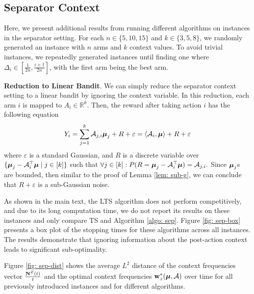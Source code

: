 \subsection{Separator Context}
    Here, we present additional results from running different algorithms on instances in the separator setting. For each $n \in \{5, 10, 15\}$ and $k \in \{3, 5, 8\}$, we randomly generated an instance with $n$ arms and $k$ context values. To avoid trivial instances, we repeatedly generated instances until finding one where $\Delta_i \in \left[\frac{1}{2n}, \frac{i+1}{2n}\right]$, with the first arm being the best arm. 


    \textbf{Reduction to Linear Bandit}. We can simply reduce the separator context setting to a linear bandit by ignoring the context variable. In this reduction, each arm $i$ is mapped to $A_{i} \in \mathbb{R}^{k}$. Then, the reward after taking action $i$ has the following equation
    $$
        Y_i = \sum_{j = 1}^{k} \mathcal{A}_{j, i} \boldsymbol{\mu}_{j} + R + \varepsilon = \langle \mathcal{A}_{i}, \boldsymbol{\mu} \rangle  + R + \varepsilon
    $$
    where $\varepsilon$ is a standard Gaussian, and $R$ is a discrete variable over $\{\boldsymbol{\mu}_j - \mathcal{A}_{i}^{\top} \boldsymbol{\mu} \mid j \in [k] \}$ such that
    $
        \forall j \in [k]: P (R  = \boldsymbol{\mu}_j - \mathcal{A}_{i}^{\top} \boldsymbol{\mu}) = \mathcal{A}_{j, i}.
    $
    Since $\boldsymbol{\mu}_j$s are bounded, then similar to the proof of Lemma \ref{lem: sub-g}, we can conclude that $R + \varepsilon$ is a sub-Gaussian noise.

    As shown in the main text, the LTS algorithm does not perform competitively, and due to its long computation time, we do not report its results on these instances and only compare TS and Algorithm \ref{algo: sep}. Figure \ref{fig: sep-box} presents a box plot of the stopping times for these algorithms across all instances. The results demonstrate that ignoring information about the post-action context leads to significant sub-optimality. 

    Figure \ref{fig: sep-dist} shows the average $L^2$ distance of the context frequencies vector $\frac{\mathbf{N}^{Z}(t)}{t}$ and the optimal context frequencies $\mathbf{w}_z^*(\boldsymbol{\mu}, \mathcal{A})$ over time for all previously introduced instances and for different algorithms. 



